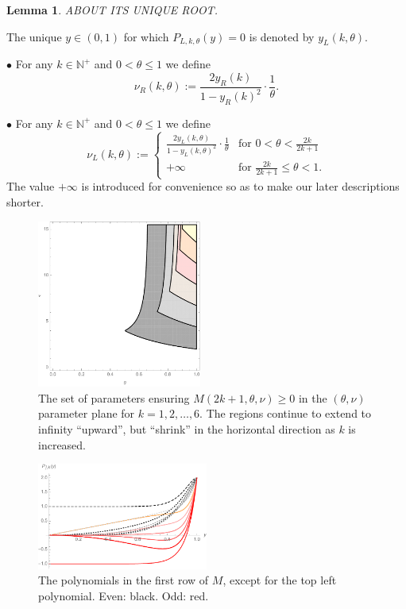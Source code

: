 \documentclass[a4paper]{article}
\newtheorem{lemma}{Lemma}
\newcommand{\te}{\theta}
\newcommand{\nul}{\nu_L(k,\theta)}
\newcommand{\nur}{\nu_R(k,\theta)}
\newcommand{\yl}{y_L(k,\theta)}
\newcommand{\yr}{y_R(k)}
\newcommand{\nplus}{\mathbb{N}^+}
\newcommand{\Pol}{P_{L,k,\te}(y)}
\begin{document}
\begin{lemma}
ABOUT ITS UNIQUE ROOT.
\end{lemma}
The unique $y\in(0,1)$ for which $\Pol=0$ is denoted by $\yl$. 

$\bullet$ For any $k\in\nplus$ and $0<\te\le 1$ we define
\[\nur:=\frac{2\yr}{1-\yr^2}\cdot \frac{1}{\te}.\]

$\bullet$ For any $k\in\nplus$ and $0<\te\le 1$ we define
\[\nul:=\begin{cases}
 \frac{2\yl}{1-\yl^2}\cdot \frac{1}{\te} & \text{for } 0<\te<\frac{2k}{2k+1}\\
 +\infty & \text{for } \frac{2k}{2k+1}\le \te<1.
\end{cases}\]
The value $+\infty$ is introduced for convenience so as to make our later descriptions shorter.



\begin{figure}
\begin{center}
\includegraphics[width=0.48\textwidth]{fig_variousk.pdf}
\caption{The set of parameters ensuring $M(2k+1,\te,\nu)\ge 0$ in the $(\te,\nu)$ parameter plane for $k=1, 2, \ldots, 6$. The regions continue to extend to infinity ``upward'', but ``shrink'' in the horizontal direction as $k$ is increased.}\label{fig_variousk}
\end{center}
\end{figure}

\begin{figure}
\begin{center}
\includegraphics[width=0.5\textwidth]{fig_excepttopleft.pdf}
\caption{The polynomials in the first row of $M$, except for the top left polynomial. Even: black. Odd: red.}\label{fig_excepttopleft}
\end{center}
\end{figure}
\end{document}

